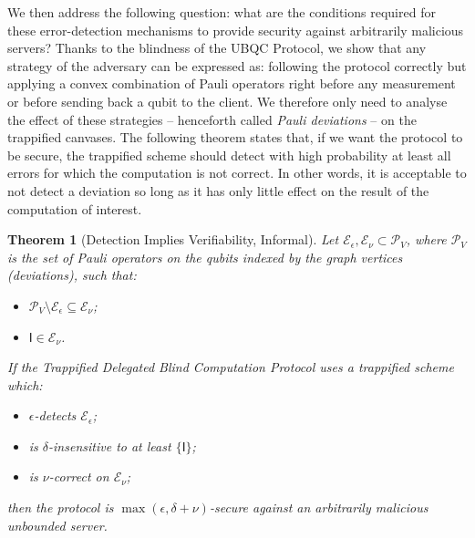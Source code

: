 \documentclass[12pt]{iopart}
\newcommand{\cptp}[1]{\mathsf{#1}} \newcommand{\pd}[1]{\mathcal{#1}}  \newcommand{\sch}[1]{\bm{#1}}
\newcommand{\Id}{\cptp{I}}
\renewcommand{\1}{\mathds{1}}
\newtheorem{theorem}{Theorem}
\begin{document}
We then address the following question: what are the conditions required for these error-detection mechanisms to provide security against arbitrarily malicious servers? Thanks to the blindness of the UBQC Protocol, we show that any strategy of the adversary can be expressed as: following the protocol correctly but applying a convex combination of Pauli operators right before any measurement or before sending back a qubit to the client. We therefore only need to analyse the effect of these strategies -- henceforth called \emph{Pauli deviations} -- on the trappified canvases.
The following theorem states that, if we want the protocol to be secure, the trappified scheme should detect with high probability at least all errors for which the computation is not correct. In other words, it is acceptable to not detect a deviation so long as it has only little effect on the result of the computation of interest.
\begin{theorem}[Detection Implies Verifiability, Informal]
Let $\mathcal E_\epsilon, \mathcal E_\nu \subset \mathcal{P}_V$, where $\mathcal{P}_V$ is the set of Pauli operators on the qubits indexed by the graph vertices (deviations), such that:
\begin{itemize}
\item $\mathcal{P}_V \setminus \mathcal E_\epsilon \subseteq \mathcal{E}_\nu$;
\item $\Id \in \mathcal E_\nu$.
\end{itemize}
If the Trappified Delegated Blind Computation Protocol uses a trappified scheme which:
\begin{itemize}
\item $\epsilon$-detects $\mathcal E_\epsilon$;
\item is $\delta$-insensitive to at least $\{\Id\}$;
\item is $\nu$-correct on $\mathcal E_\nu$;
\end{itemize}
then the protocol is $\max(\epsilon, \delta+\nu)$-secure against an arbitrarily malicious unbounded server.
\end{theorem}
\end{document}

